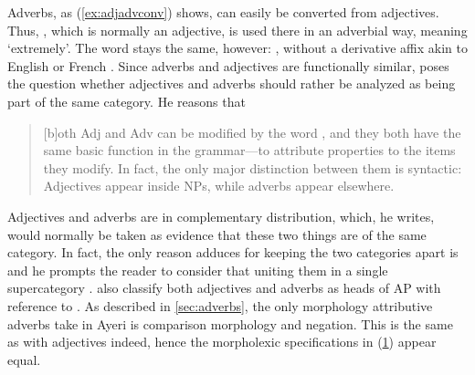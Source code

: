 Adverbs, as (\ref{ex:adjadvconv}) shows, can easily be converted from
adjectives. Thus, , which is normally an adjective,
is used there in an adverbial way, meaning `extremely'. The word stays the
same, however: , without a derivative affix akin to English
 or French . Since adverbs and adjectives are functionally
similar, \citet{carnie2013} poses the question whether adjectives and adverbs
should rather be analyzed as being part of the same category. He reasons that

\blockcquote[51]{carnie2013}{[b]oth Adj and Adv can be modified by the word
, and they both have the same basic function in the grammar---to
attribute properties to the items they modify. In fact, the only major
distinction between them is syntactic: Adjectives appear inside NPs, while
adverbs appear elsewhere.}

Adjectives and adverbs are in complementary distribution, which, he writes,
would normally be taken as evidence that these two things are of the same
category. In fact, the only reason \citet{carnie2013} adduces for keeping the
two categories apart is 
and he prompts the reader to consider that uniting them in a single
supercategory . \citet[126]{bresnan2016} also
classify both adjectives and adverbs as heads of AP with reference to
\citet{emonds1976}. As described in \autoref{sec:adverbs}, the only morphology
attributive adverbs take in Ayeri is comparison morphology and negation. This
is the same as with adjectives indeed, hence the morpholexic specifications
in (\ref{ex:advmorphlex}) appear equal.

\begin{figure}
\begin{morphlex}
\ex\label{ex:advmorphlex}%
\xe
\end{morphlex}
\end{figure}


